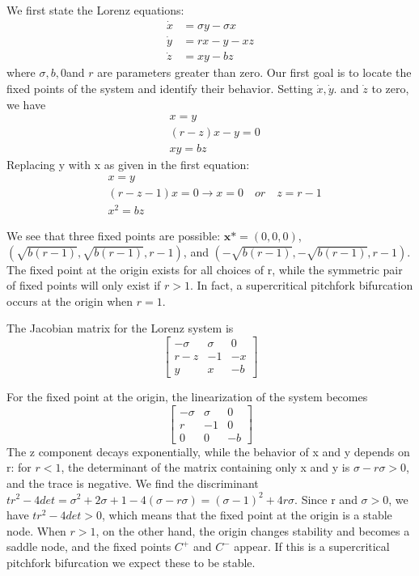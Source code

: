 \documentclass{report}
\begin{document}
We first state the Lorenz equations:
\begin{align*}
   \dot{x} &= \sigma y - \sigma x \\
   \dot{y} &= rx - y - xz \\
   \dot{z} &= xy - bz
\end{align*}
where \( \sigma , b,0\)and \(r\) are parameters greater than zero. Our first
goal is to locate the fixed points of the system and identify their behavior.
Setting \(\dot{x},\dot{y}\). and \(\dot{z}\) to zero, we have
\begin{align*}
   &x = y \\
   &(r-z)x - y = 0 \\
   &xy = bz
\end{align*}
Replacing y with x as given in the first equation:
\begin{align*}
  &x = y \\
  &(r-z-1)x = 0 \rightarrow x = 0 \quad or \quad z = r-1 \\
  &x^2 = bz
\end{align*}

We see that three fixed points are possible: \(\boldsymbol{x\mbox{*}} = (0,0,0)\),
\((\sqrt{b(r-1)},\sqrt{b(r-1)},r-1)\), and \((-\sqrt{b(r-1)},-\sqrt{b(r-1)},r-1)\).
The fixed point at the origin exists for all choices of r, while the symmetric 
pair of fixed points will only exist if \(r > 1\). In fact, a supercritical 
pitchfork bifurcation occurs at the origin when \( r = 1 \).

The Jacobian matrix for the Lorenz system is
\[
\begin{bmatrix}
   -\sigma & \sigma & 0 \\
   r - z & -1 & -x \\
   y & x & -b
\end{bmatrix}
\]

For the fixed point at the origin, the linearization of the system becomes
\[
\begin{bmatrix}
   -\sigma & \sigma & 0 \\
   r & -1 & 0 \\
   0 & 0 & -b

\end{bmatrix}
\]
The z component decays exponentially, while the behavior of x and y depends on 
r: for \( r < 1\), the determinant of the matrix containing only x and y is
\(\sigma - r\sigma > 0\), and the trace is negative. We find the discriminant 
\(tr^2 - 4det = \sigma^2 +2\sigma + 1 -4(\sigma -r\sigma) = (\sigma - 1)^2 +
  4r\sigma\). Since r and \(\sigma > 0 \), we have \(tr^2 -4det > 0\), which 
means that the fixed point at the origin is a stable node. When \(r > 1\), on 
the other hand, the origin changes stability and becomes a saddle node, and the
fixed points \(C^+\) and \(C^-\) appear. If this is a supercritical pitchfork
bifurcation we expect these to be stable.
\end{document}
